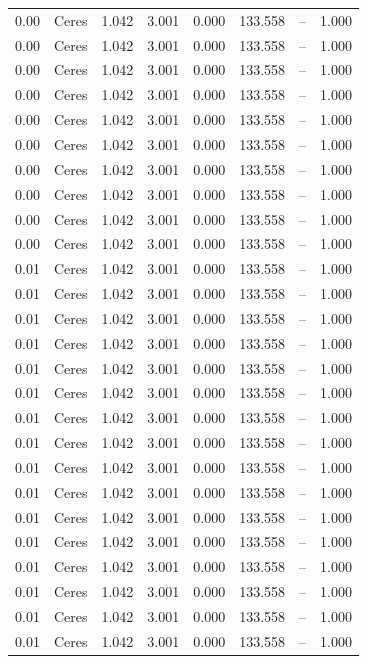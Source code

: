 \begin{table}[H]
\begin{tabular}{l c l l l}
0.00 & Ceres & 1.042 & 3.001 & 0.000 & 133.558 & -- & 1.000 \\
0.00 & Ceres & 1.042 & 3.001 & 0.000 & 133.558 & -- & 1.000 \\
0.00 & Ceres & 1.042 & 3.001 & 0.000 & 133.558 & -- & 1.000 \\
0.00 & Ceres & 1.042 & 3.001 & 0.000 & 133.558 & -- & 1.000 \\
0.00 & Ceres & 1.042 & 3.001 & 0.000 & 133.558 & -- & 1.000 \\
0.00 & Ceres & 1.042 & 3.001 & 0.000 & 133.558 & -- & 1.000 \\
0.00 & Ceres & 1.042 & 3.001 & 0.000 & 133.558 & -- & 1.000 \\
0.00 & Ceres & 1.042 & 3.001 & 0.000 & 133.558 & -- & 1.000 \\
0.00 & Ceres & 1.042 & 3.001 & 0.000 & 133.558 & -- & 1.000 \\
0.00 & Ceres & 1.042 & 3.001 & 0.000 & 133.558 & -- & 1.000 \\
0.01 & Ceres & 1.042 & 3.001 & 0.000 & 133.558 & -- & 1.000 \\
0.01 & Ceres & 1.042 & 3.001 & 0.000 & 133.558 & -- & 1.000 \\
0.01 & Ceres & 1.042 & 3.001 & 0.000 & 133.558 & -- & 1.000 \\
0.01 & Ceres & 1.042 & 3.001 & 0.000 & 133.558 & -- & 1.000 \\
0.01 & Ceres & 1.042 & 3.001 & 0.000 & 133.558 & -- & 1.000 \\
0.01 & Ceres & 1.042 & 3.001 & 0.000 & 133.558 & -- & 1.000 \\
0.01 & Ceres & 1.042 & 3.001 & 0.000 & 133.558 & -- & 1.000 \\
0.01 & Ceres & 1.042 & 3.001 & 0.000 & 133.558 & -- & 1.000 \\
0.01 & Ceres & 1.042 & 3.001 & 0.000 & 133.558 & -- & 1.000 \\
0.01 & Ceres & 1.042 & 3.001 & 0.000 & 133.558 & -- & 1.000 \\
0.01 & Ceres & 1.042 & 3.001 & 0.000 & 133.558 & -- & 1.000 \\
0.01 & Ceres & 1.042 & 3.001 & 0.000 & 133.558 & -- & 1.000 \\
0.01 & Ceres & 1.042 & 3.001 & 0.000 & 133.558 & -- & 1.000 \\
0.01 & Ceres & 1.042 & 3.001 & 0.000 & 133.558 & -- & 1.000 \\
0.01 & Ceres & 1.042 & 3.001 & 0.000 & 133.558 & -- & 1.000 \\
0.01 & Ceres & 1.042 & 3.001 & 0.000 & 133.558 & -- & 1.000 \\

\end{tabular}
\end{table}
